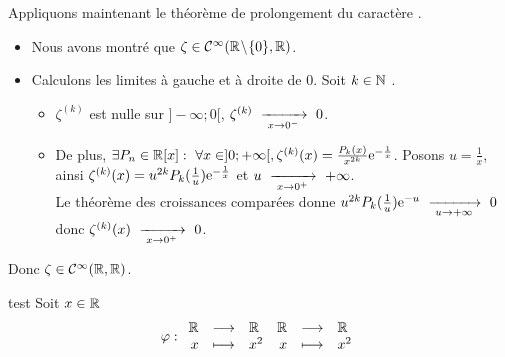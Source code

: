 \documentclass{article}
\begin{document}
\begin{question_kholle}
\begin{itemize}[label=$\star$]
		      Appliquons maintenant le théorème de prolongement du caractère \Cont{\infty}{}{}.
		      \begin{itemize}[label=$\star$]
			      \item Nous avons montré que $\zeta \in  \Cont{\infty}{\R \!\setminus\! \{0\}}{}$.
			      \item Calculons les limites à gauche et à droite de 0. Soit $k \in \mathbb N$ \fq.
			            \begin{itemize}[label=$\star\star$]
				            \item $\zeta^{(k)}$ est nulle sur $]-\infty;0[$, $\zeta^{(k)} \ \xrightarrow[\;x \to 0^-\;]{}\  0$.
				            \item De plus, $\exists P_n \in \R[x] : \ \forall x \in ]0;+\infty[, \zeta^{(k)}(x) = \frac{P_k(x)}{x^{2k}} \e^{-\frac{1}{x}}$. Posons $u = \frac{1}{x}$, ainsi $\zeta^{(k)}(x) = u^{2k} P_k(\frac{1}{u}) \mathrm e^{-\frac{1}{x}}$ et $u \ \xrightarrow[\;x \to 0^+\;]{}\  +\infty$. \\
				                  Le théorème des croissances comparées donne $u^{2k} P_k(\frac{1}{u}) \mathrm e^{-u} \ \xrightarrow[\;u \to +\infty\;]{}\  0$ donc $\zeta^{(k)}(x) \ \xrightarrow[\;x \to 0^+\;]{}\  0$.
			            \end{itemize}
		      \end{itemize}
		      Donc $\zeta \in \Cont{\infty}{\R}{\R}$.
	\end{itemize}
\end{question_kholle}

\begin{question_kholle}{test}
	Soit $x\in\mathbb R$
	\[
		\varphi :
		\begin{array}{rcl}
			\R & \longrightarrow & \R    \\
			x  & \longmapsto     & x^{2}
		\end{array}

		\applic{\R}{\R}{x}{x^{2}}
	\]
\end{question_kholle}
\end{document}
